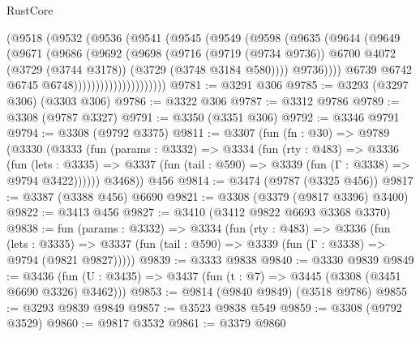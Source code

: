 \begin{lexlean}{RustCore}
\begin{coremodule}
                            (@9518
                              (@9532
                                (@9536
                                  (@9541
                                    (@9545
                                      (@9549
                                        (@9598
                                          (@9635
                                            (@9644
                                              (@9649
                                                (@9671
                                                  (@9686
                                                    (@9692
                                                      (@9698
                                                        (@9716
                                                          (@9719 (@9734 @9736))
                                                          @6700
                                                          @4072
                                                          (@3729 (@3744 @3178))
                                                          (@3729 (@3748 @3184 @580))))
                                                      @9736))))
                                              @6739
                                              @6742
                                              @6745
                                              @6748)))))))))))))))))))))
@9781 := @3291 @306
@9785 := @3293 (@3297 @306) (@3303 @306)
@9786 := @3322 @306
@9787 := @3312 @9786
@9789 := @3308 (@9787 @3327)
@9791 := @3350 (@3351 @306)
@9792 := @3346 @9791
@9794 := @3308 (@9792 @3375)
@9811 := @3307
    (fun (fn : @30) =>
    @9789
      (@3330
        (@3333
          (fun (params : @3332) =>
          @3334
            (fun (rty : @483) =>
            @3336
              (fun (lets : @3335) =>
              @3337 (fun (tail : @590) => @3339 (fun (Γ : @3338) => @9794 @3422))))))
        @3468))
    @456
@9814 := @3474 (@9787 (@3325 @456))
@9817 := @3387 (@3388 @456) @6690
@9821 := @3308 (@3379 (@9817 @3396) @3400)
@9822 := @3413 @456
@9827 := @3410 (@3412 @9822 @6693 @3368 @3370)
@9838 := fun (params : @3332) =>
  @3334
    (fun (rty : @483) =>
    @3336
      (fun (lets : @3335) =>
      @3337 (fun (tail : @590) => @3339 (fun (Γ : @3338) => @9794 (@9821 @9827)))))
@9839 := @3333 @9838
@9840 := @3330 @9839
@9849 := @3436 (fun (U : @3435) => @3437 (fun (t : @7) => @3445 (@3308 (@3451 @6690 @3326) @3462)))
@9853 := @9814 (@9840 @9849) (@3518 @9786)
@9855 := @3293 @9839 @9849
@9857 := @3523 @9838 @549
@9859 := @3308 (@9792 @3529)
@9860 := @9817 @3532
@9861 := @3379 @9860

\end{coremodule}
\end{lexlean}
